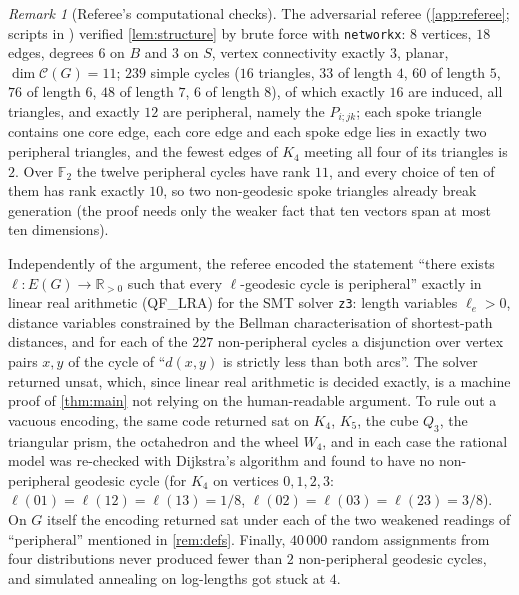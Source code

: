 \documentclass[11pt,a4paper]{article}
\theoremstyle{plain}
\theoremstyle{definition}
\theoremstyle{remark}
\newtheorem{remark}[theorem]{Remark}
\newcommand{\R}{\mathbb R}
\newcommand{\F}{\mathbb F_2}
\newcommand{\cyc}{\mathcal C}
\begin{document}
\begin{remark}[Referee's computational checks]\label{rem:checks}
The adversarial referee (\cref{app:referee}; scripts in ) verified \cref{lem:structure} by brute force with \texttt{networkx}: $8$ vertices, $18$ edges, degrees $6$ on $B$ and $3$ on $S$, vertex connectivity exactly $3$, planar, $\dim\cyc(G)=11$; $239$ simple cycles ($16$ triangles, $33$ of length $4$, $60$ of length $5$, $76$ of length $6$, $48$ of length $7$, $6$ of length $8$), of which exactly $16$ are induced, all triangles, and exactly $12$ are peripheral, namely the $P_{i;jk}$; each spoke triangle contains one core edge, each core edge and each spoke edge lies in exactly two peripheral triangles, and the fewest edges of $K_4$ meeting all four of its triangles is $2$. Over $\F$ the twelve peripheral cycles have rank $11$, and every choice of ten of them has rank exactly $10$, so two non-geodesic spoke triangles already break generation (the proof needs only the weaker fact that ten vectors span at most ten dimensions).

Independently of the argument, the referee encoded the statement ``there exists $\ell\colon E(G)\to\R_{>0}$ such that every $\ell$-geodesic cycle is peripheral'' exactly in linear real arithmetic (\textsf{QF\_LRA}) for the SMT solver \texttt{z3}: length variables $\ell_e>0$, distance variables constrained by the Bellman characterisation of shortest-path distances, and for each of the $227$ non-peripheral cycles a disjunction over vertex pairs $x,y$ of the cycle of ``$d(x,y)$ is strictly less than both arcs''. The solver returned \textsf{unsat}, which, since linear real arithmetic is decided exactly, is a machine proof of \cref{thm:main} not relying on the human-readable argument. To rule out a vacuous encoding, the same code returned \textsf{sat} on $K_4$, $K_5$, the cube $Q_3$, the triangular prism, the octahedron and the wheel $W_4$, and in each case the rational model was re-checked with Dijkstra's algorithm and found to have no non-peripheral geodesic cycle (for $K_4$ on vertices $0,1,2,3$: $\ell(01)=\ell(12)=\ell(13)=1/8$, $\ell(02)=\ell(03)=\ell(23)=3/8$). On $G$ itself the encoding returned \textsf{sat} under each of the two weakened readings of ``peripheral'' mentioned in \cref{rem:defs}. Finally, $40\,000$ random assignments from four distributions never produced fewer than $2$ non-peripheral geodesic cycles, and simulated annealing on log-lengths got stuck at $4$.
\end{remark}
\end{document}
